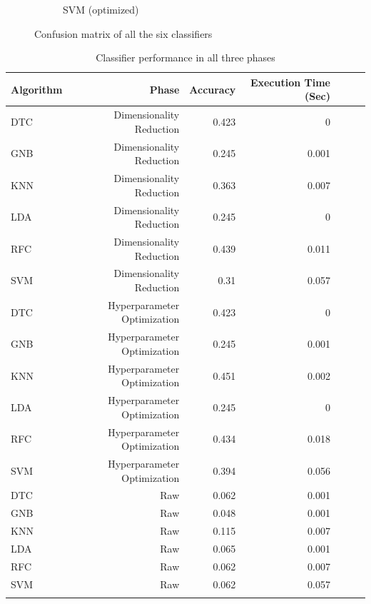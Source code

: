 \documentclass[conference,onecolumn]{IEEEtran}
\begin{document}
\begin{figure}
\begin{subfigure}{0.4\textwidth}
            \caption{SVM (optimized)}
            \label{appx:cmheatmapsvm}
        \end{subfigure}
        \caption{Confusion matrix of all the six classifiers}
        \label{appdx:confusionMatrixOfAllTheSixClassifiers}
    \end{figure}

    \begin{longtable}{lrrrrrr}
        \hline
         Algorithm   & Phase                        & Accuracy   & Execution Time (Sec) \\ \hline
         DTC         & Dimensionality Reduction     & 0.423      & 0     \\
         GNB         & Dimensionality Reduction     & 0.245      & 0.001 \\
         KNN         & Dimensionality Reduction     & 0.363      & 0.007 \\
         LDA         & Dimensionality Reduction     & 0.245      & 0     \\
         RFC         & Dimensionality Reduction     & 0.439      & 0.011 \\
         SVM         & Dimensionality Reduction     & 0.31       & 0.057 \\
         DTC         & Hyperparameter Optimization  & 0.423      & 0     \\
         GNB         & Hyperparameter Optimization  & 0.245      & 0.001 \\
         KNN         & Hyperparameter Optimization  & 0.451      & 0.002 \\
         LDA         & Hyperparameter Optimization  & 0.245      & 0     \\
         RFC         & Hyperparameter Optimization  & 0.434      & 0.018 \\
         SVM         & Hyperparameter Optimization  & 0.394      & 0.056 \\
         DTC         & Raw                          & 0.062      & 0.001 \\
         GNB         & Raw                          & 0.048      & 0.001 \\
         KNN         & Raw                          & 0.115      & 0.007 \\
         LDA         & Raw                          & 0.065      & 0.001 \\
         RFC         & Raw                          & 0.062      & 0.007 \\
         SVM         & Raw                          & 0.062      & 0.057 \\
        \hline
        \caption{Classifier performance in all three phases}
        \label{appdx:classifierPerformanceInAllThreePhases}
    \end{longtable}
\end{document}

